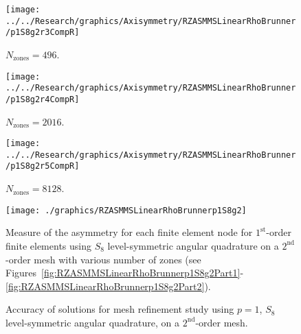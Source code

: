 \documentclass[12pt,letterpaper]{article}
\begin{document}
\begin{sidewaysfigure}[!htb]
\centering
\begin{subfigure}{0.33\textwidth}
\texttt{[image: ../../Research/graphics/Axisymmetry/RZASMMSLinearRhoBrunner/p1S8g2r3CompR]}
\caption{$N_\text{zones}=496$.}
\end{subfigure}%
\begin{subfigure}{0.33\textwidth}
\texttt{[image: ../../Research/graphics/Axisymmetry/RZASMMSLinearRhoBrunner/p1S8g2r4CompR]}
\caption{$N_\text{zones}=2016$.}
\end{subfigure}%
\begin{subfigure}{0.33\textwidth}
\texttt{[image: ../../Research/graphics/Axisymmetry/RZASMMSLinearRhoBrunner/p1S8g2r5CompR]}
\caption{$N_\text{zones}=8128$.}
\end{subfigure}
\caption{Relative asymmetry for $p=1$ finite elements on a $2^\text{nd}$-order mesh for $S_8$ level-symmetric angular quadrature; mesh overlay may be removed for clarity.}
\label{fig:RZASMMSLinearRhoBrunnerp1S8g2Part2}
\end{sidewaysfigure}

\begin{figure}[!htb]
\centering
\texttt{[image: ./graphics/RZASMMSLinearRhoBrunnerp1S8g2]}
\caption{Measure of the asymmetry for each finite element node for $1^\text{st}$-order finite elements using $S_8$ level-symmetric angular quadrature on a $2^\text{nd}$-order mesh with various number of zones (see Figures~\ref{fig:RZASMMSLinearRhoBrunnerp1S8g2Part1}-\ref{fig:RZASMMSLinearRhoBrunnerp1S8g2Part2}).}
\label{fig:RZASMMSLinearRhoBrunnerp1S8g2Nodes}
\end{figure}

\begin{figure}[!htb]
\centering
{}
\caption{Accuracy of solutions for mesh refinement study using $p=1$, $S_8$ level-symmetric angular quadrature, on a $2^\text{nd}$-order mesh.}
\label{fig:RZASMMSLinearRhoBrunnerp1S8g2Accuracy}
\end{figure}
\end{document}
